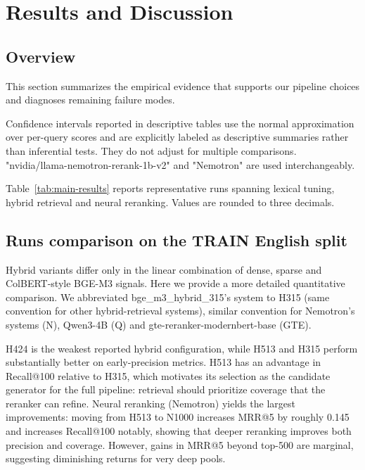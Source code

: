 \section{Results and Discussion}\label{sec:results}

\subsection{Overview}
This section summarizes the empirical evidence that supports our pipeline choices and diagnoses remaining failure modes. 

Confidence intervals reported in descriptive tables use the normal approximation over per-query scores and are explicitly labeled as descriptive
summaries rather than inferential tests. They do not adjust for multiple comparisons. "nvidia/llama-nemotron-rerank-1b-v2" and "Nemotron" are used interchangeably.

Table~\ref{tab:main-results} reports representative runs spanning lexical tuning, hybrid retrieval and neural reranking. Values are rounded to three decimals. 


\subsection{Runs comparison on the TRAIN English split}\label{sub:run-comparison}

Hybrid variants differ only in the linear combination of dense, sparse and ColBERT-style BGE-M3 signals. Here we provide a more detailed quantitative comparison. We abbreviated bge\_m3\_hybrid\_315's system to H315 (same convention for other hybrid-retrieval systems), similar convention for Nemotron's systems (N), Qwen3-4B (Q) and gte-reranker-modernbert-base (GTE). 

H424 is the weakest reported hybrid configuration, while H513 and H315 perform substantially better on early-precision metrics. H513 has an advantage in Recall@100 relative to H315, which motivates its selection as the candidate generator for the full pipeline: retrieval should prioritize coverage that the reranker can refine. Neural reranking (Nemotron) yields the largest improvements: moving from H513 to N1000 increases MRR@5 by roughly 0.145 and increases Recall@100 notably, showing that deeper reranking improves both precision and coverage. However, gains in MRR@5 beyond top-500 are marginal, suggesting diminishing returns for very deep pools.

